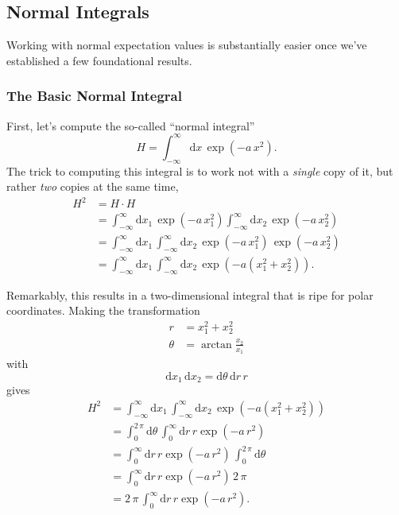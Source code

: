 \documentclass[
  letterpaper,
  DIV=11,
  numbers=noendperiod]{scrartcl}
\begin{document}
\subsection{Normal Integrals}\label{normal-integrals}

Working with normal expectation values is substantially easier once
we've established a few foundational results.

\subsubsection{The Basic Normal
Integral}\label{the-basic-normal-integral}

First, let's compute the so-called ``normal integral'' \[
H =
\int_{-\infty}^{\infty} \mathrm{d} x \,
\exp \left( -a \, x^{2} \right).
\] The trick to computing this integral is to work not with a
\emph{single} copy of it, but rather \emph{two} copies at the same time,
\begin{align*}
H^{2}
&=
H \cdot H
\\
&=
\int_{-\infty}^{\infty} \mathrm{d} x_{1} \, \exp \left( -a \, x_{1}^{2} \right)
\int_{-\infty}^{\infty} \mathrm{d} x_{2} \, \exp \left( -a \, x_{2}^{2} \right)
\\
&=
\int_{-\infty}^{\infty} \mathrm{d} x_{1} \,
\int_{-\infty}^{\infty} \mathrm{d} x_{2} \,
\exp \left( -a \, x_{1}^{2} \right) \, \exp \left( -a \, x_{2}^{2} \right)
\\
&=
\int_{-\infty}^{\infty} \mathrm{d} x_{1} \,
\int_{-\infty}^{\infty} \mathrm{d} x_{2} \,
\exp \left( -a \left( x_{1}^{2} + x_{2}^{2} \right) \right).
\end{align*}

Remarkably, this results in a two-dimensional integral that is ripe for
polar coordinates. Making the transformation \begin{align*}
r &= x_{1}^{2} + x_{2}^{2}
\\
\theta &= \arctan \frac{x_{2}}{x_{1}}
\end{align*} with \[
\mathrm{d} x_{1} \, \mathrm{d} x_{2}
=
\mathrm{d} \theta \, \mathrm{d} r \, r
\] gives \begin{align*}
H^{2}
&=
\int_{-\infty}^{\infty} \mathrm{d} x_{1} \,
\int_{-\infty}^{\infty} \mathrm{d} x_{2} \,
\exp \left( -a \left( x_{1}^{2} + x_{2}^{2} \right) \right)
\\
&=
\int_{0}^{2 \, \pi} \mathrm{d} \theta \,
\int_{0}^{\infty} \mathrm{d} r \, r
\exp \left( -a \, r^{2} \right)
\\
&=
\int_{0}^{\infty} \mathrm{d} r \, r
\exp \left( -a \, r^{2} \right) \,
\int_{0}^{2 \, \pi} \mathrm{d} \theta
\\
&=
\int_{0}^{\infty} \mathrm{d} r \, r
\exp \left( -a \, r^{2} \right) \, 2 \, \pi
\\
&=
2 \, \pi \, \int_{0}^{\infty} \mathrm{d} r \, r
\exp \left( -a \, r^{2} \right).
\end{align*}
\end{document}
